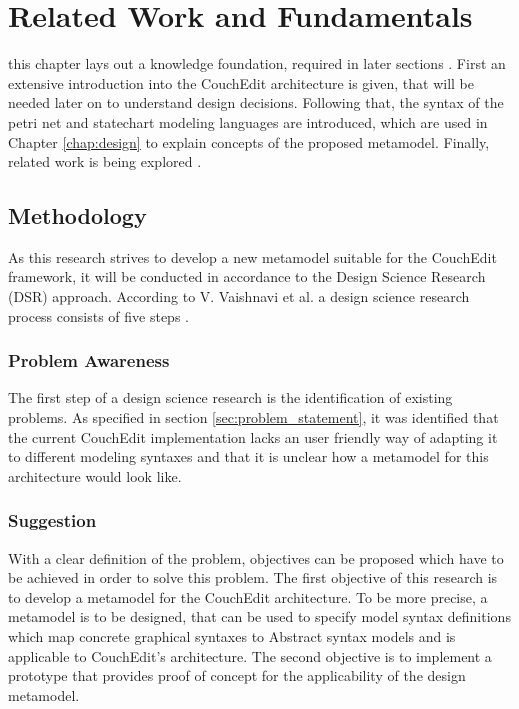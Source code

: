 \chapter{Related Work and Fundamentals}

this chapter lays out a knowledge foundation, required in later sections . First an extensive introduction into the CouchEdit architecture is given, that will be needed later on to understand design decisions. Following that, the syntax of the petri net and statechart modeling languages are introduced, which are used in Chapter \ref{chap:design} to explain concepts of the proposed metamodel. Finally, related work is being explored . 


\section{Methodology}

As this research strives to develop a new metamodel suitable for the CouchEdit framework, it will be conducted in accordance to the Design Science Research (DSR) approach. According to V. Vaishnavi et al. a design science research process consists of five steps \cite{vaishnavi_design_2004}.

\subsection{Problem Awareness}
The first step of a design science research is the identification of existing problems. As specified in section \ref{sec:problem_statement}, it was identified that the current CouchEdit implementation lacks an user friendly way of adapting it to different modeling syntaxes and that it is unclear how a metamodel for this architecture would look like.

\subsection{Suggestion}
With a clear definition of the problem, objectives can be proposed which have to be achieved in order to solve this problem. The first objective of this research is to develop a metamodel for the CouchEdit architecture. To be more precise, a metamodel is to be designed, that can be used to specify model syntax definitions which map concrete graphical syntaxes to Abstract syntax models and is applicable to CouchEdit's architecture. The second objective is to implement a prototype that provides proof of concept for the applicability of the design metamodel.


